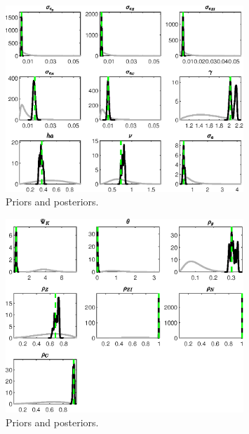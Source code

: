  
\begin{figure}[H]
\centering
\includegraphics[width=0.80\textwidth]{RBC_growth/Output/RBC_growth_PriorsAndPosteriors1}
\caption{Priors and posteriors.}\label{Fig:PriorsAndPosteriors:1}
\end{figure}
 
\begin{figure}[H]
\centering
\includegraphics[width=0.80\textwidth]{RBC_growth/Output/RBC_growth_PriorsAndPosteriors2}
\caption{Priors and posteriors.}\label{Fig:PriorsAndPosteriors:2}
\end{figure}
 
